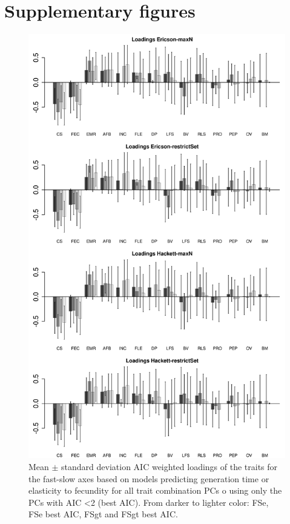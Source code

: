 \clearpage%


\section*{Supplementary figures}

\begin{figure}[ht!]
\centering
\includegraphics[width=.8\textwidth]{./Figures/Appendix2_1/FS loadings plots-ALL.png}
\caption[LHT loadings of the FS axes]{
Mean $\pm$ standard deviation AIC weighted loadings of the traits for the
fast-slow axes based on models predicting generation time or elasticity to
fecundity for all trait combination PCs o using only the PCs with AIC
\textless{2} (best AIC). From darker to lighter color: FSe, FSe best AIC, FSgt
and FSgt best AIC.}
\label{fig:figApp2.1}
\end{figure}

